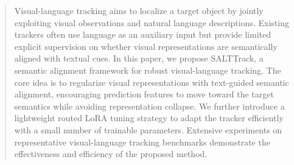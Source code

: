 \begin{abstract}
Visual-language tracking aims to localize a target object by jointly exploiting visual observations and natural language descriptions. Existing trackers often use language as an auxiliary input but provide limited explicit supervision on whether visual representations are semantically aligned with textual cues. In this paper, we propose SALTTrack, a semantic alignment framework for robust visual-language tracking. The core idea is to regularize visual representations with text-guided semantic alignment, encouraging prediction features to move toward the target semantics while avoiding representation collapse. We further introduce a lightweight routed LoRA tuning strategy to adapt the tracker efficiently with a small number of trainable parameters. Extensive experiments on representative visual-language tracking benchmarks demonstrate the effectiveness and efficiency of the proposed method.
\end{abstract}

